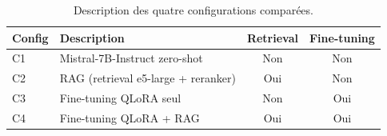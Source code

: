 \begin{table}[t]
\centering
\caption{Description des quatre configurations comparées.}
\label{tab:config-description}
\begin{tabular}{llcc}
\toprule
Config & Description & Retrieval & Fine-tuning \\
\midrule
C1 & Mistral-7B-Instruct zero-shot & Non & Non \\
C2 & RAG (retrieval e5-large + reranker) & Oui & Non \\
C3 & Fine-tuning QLoRA seul & Non & Oui \\
C4 & Fine-tuning QLoRA + RAG & Oui & Oui \\
\bottomrule
\end{tabular}
\end{table}
